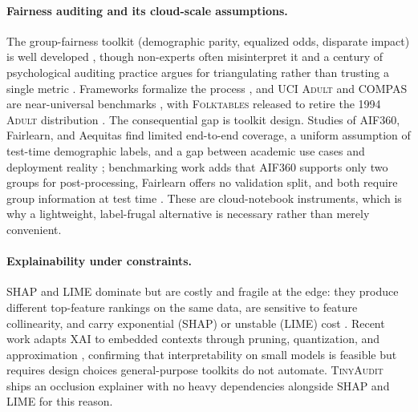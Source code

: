 \documentclass[11pt]{article}
\newcommand{\dataset}[1]{\textsc{#1}}
\begin{document}
\paragraph{Fairness auditing and its cloud-scale assumptions.} The group-fairness
toolkit (demographic parity, equalized odds, disparate impact) is well
developed \cite{pagano2023fairness}, though non-experts often misinterpret it
\cite{saha2019measuring} and a century of psychological auditing practice argues
for triangulating rather than trusting a single metric
\cite{landers2022auditing}. Frameworks formalize the process
\cite{maneriker2023avoir,tang2023trustless,lalor2024fairframe}, and \dataset{UCI
Adult} and \dataset{COMPAS} are near-universal benchmarks
\cite{fabris2022datasets}, with \dataset{Folktables} released to retire the
1994 \dataset{Adult} distribution \cite{ding2021retiring}. The consequential gap
is toolkit design. Studies of AIF360, Fairlearn, and Aequitas find limited
end-to-end coverage, a uniform assumption of test-time demographic labels, and a
gap between academic use cases and deployment reality
\cite{lee2021landscape,deng2022exploring}; benchmarking work adds that AIF360
supports only two groups for post-processing, Fairlearn offers no validation
split, and both require group information at test time
\cite{han2024ffb}. These are cloud-notebook instruments, which is why a
lightweight, label-frugal alternative is necessary rather than merely convenient.

\paragraph{Explainability under constraints.} SHAP and LIME dominate but are
costly and fragile at the edge: they produce different top-feature rankings on
the same data, are sensitive to feature collinearity, and carry exponential
(SHAP) or unstable (LIME) cost \cite{salih2025explainable,sufian2024xai}. Recent
work adapts XAI to embedded contexts through pruning, quantization, and
approximation \cite{nguyen2025xedgeai,alnusif2025xai}, confirming that
interpretability on small models is feasible but requires design choices
general-purpose toolkits do not automate. \textsc{TinyAudit} ships an
occlusion explainer with no heavy dependencies alongside SHAP and LIME for this
reason.
\end{document}
